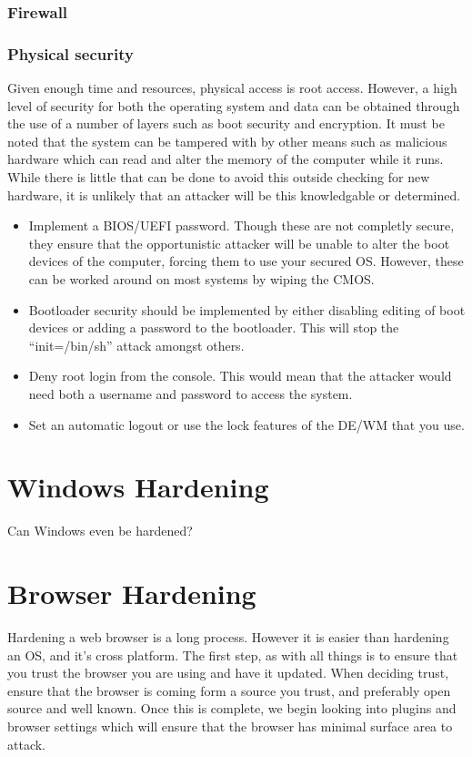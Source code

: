 \documentclass[a4paper,11pt]{report}
\begin{document}
				\subsubsection{Firewall} %
				\subsubsection{Physical security}
					Given enough time and resources, physical access is root access. 
					However, a high level of security for both the operating system and data can be obtained through the use of a number of layers such as boot security and encryption. 
					It must be noted that the system can be tampered with by other means such as malicious hardware which can read and alter the memory of the computer while it runs. While there is little that can be done to avoid this outside checking for new hardware, it is unlikely that an attacker will be this knowledgable or determined. 
					\begin{itemize}
						\item Implement a BIOS/UEFI password. 
							Though these are not completly secure, they ensure that the opportunistic attacker will be unable to alter the boot devices of the computer, forcing them to use your secured OS. 
							However, these can be worked around on most systems by wiping the CMOS. 
						\item Bootloader security should be implemented by either disabling editing of boot devices or adding a password to the bootloader. 
							This will stop the ``init=/bin/sh'' attack amongst others. 
						\item Deny root login from the console. 
							This would mean that the attacker would need both a username and password to access the system. 
						\item Set an automatic logout or use the lock features of the DE/WM that you use. 
					\end{itemize}
	\section{Windows Hardening}
		Can Windows even be hardened?
	\section{Browser Hardening}
		Hardening a web browser is a long process. However it is easier than hardening an OS, and it's cross platform. 
		The first step, as with all things is to ensure that you trust the browser you are using and have it updated. 
		When deciding trust, ensure that the browser is coming form a source you trust, and preferably open source and well known. 
		Once this is complete, we begin looking into plugins and browser settings which will ensure that the browser has minimal surface area to attack. 
\end{document}

